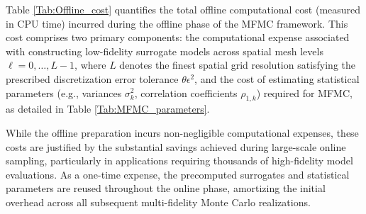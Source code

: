  Table \ref{Tab:Offline_cost} quantifies the total offline computational cost (measured in CPU time) incurred during the offline phase of the MFMC framework.  This cost comprises two primary components: the computational expense associated with constructing low-fidelity surrogate models across spatial mesh levels  $\ell = 0, \ldots, L-1$, where $L$ denotes the finest spatial grid resolution satisfying the prescribed discretization error tolerance $\theta\epsilon^2$, and the cost of estimating statistical parameters (e.g., variances $\sigma_k^2$, correlation coefficients $\rho_{1,k}$) required for MFMC, as detailed in Table \ref{Tab:MFMC_parameters}. 
 
 While the offline preparation incurs non-negligible computational expenses, these costs are justified by the substantial savings achieved during large-scale online sampling, particularly in applications requiring thousands of high-fidelity model evaluations. As a one-time expense, the precomputed surrogates and statistical parameters are reused throughout the online phase, amortizing the initial overhead across all subsequent multi-fidelity Monte Carlo realizations.

%
\begin{table}[ht]
\centering
{}
\caption{The offline cost. The second row--CPU time to construct surrogate $\widehat u_{h,k}$ with sparse grid level $q=1$ with respect to decreasing tolerance. The third row corresponds to the total time to estimate the parameters with 500 samples, this cost includes evaluation of surrogate and direct computation, interpolation to solution to the common fine mesh, and use Welford's algorithm to compute the sample statistics.}
\label{Tab:Offline_cost}
\end{table}
%






